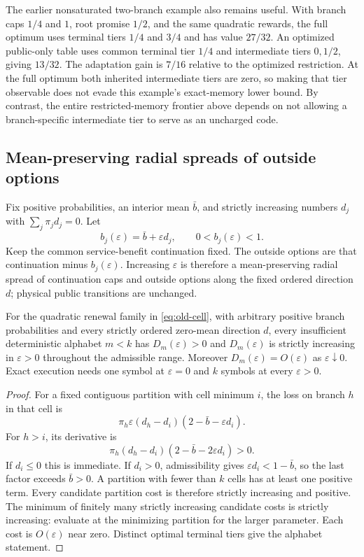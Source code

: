 The earlier nonsaturated two-branch example also remains useful. With branch caps $1/4$ and $1$, root promise $1/2$, and the same quadratic rewards, the full optimum uses terminal tiers $1/4$ and $3/4$ and has value $27/32$. An optimized public-only table uses common terminal tier $1/4$ and intermediate tiers $0,1/2$, giving $13/32$. The adaptation gain is $7/16$ relative to the optimized restriction. At the full optimum both inherited intermediate tiers are zero, so making that tier observable does not evade this example's exact-memory lower bound. By contrast, the entire restricted-memory frontier above depends on not allowing a branch-specific intermediate tier to serve as an uncharged code.

\subsection{Mean-preserving radial spreads of outside options}
Fix positive probabilities, an interior mean $\bar b$, and strictly increasing numbers $d_j$ with $\sum_j\pi_jd_j=0$. Let
\begin{equation}\label{eq:dispersion-family}
 b_j(\varepsilon)=\bar b+\varepsilon d_j,
 \qquad 0<b_j(\varepsilon)<1.
\end{equation}
Keep the common service-benefit continuation fixed. The outside options are that continuation minus $b_j(\varepsilon)$. Increasing $\varepsilon$ is therefore a mean-preserving radial spread of continuation caps and outside options along the fixed ordered direction $d$; physical public transitions are unchanged.

\begin{proposition}\label{prop:dispersion}
For the quadratic renewal family in \eqref{eq:old-cell}, with arbitrary positive branch probabilities and every strictly ordered zero-mean direction $d$, every insufficient deterministic alphabet $m<k$ has $D_m(\varepsilon)>0$ and $D_m(\varepsilon)$ is strictly increasing in $\varepsilon>0$ throughout the admissible range. Moreover $D_m(\varepsilon)=O(\varepsilon)$ as $\varepsilon\downarrow0$. Exact execution needs one symbol at $\varepsilon=0$ and $k$ symbols at every $\varepsilon>0$.
\end{proposition}
\begin{proof}
For a fixed contiguous partition with cell minimum $i$, the loss on branch $h$ in that cell is
\[
 \pi_h\varepsilon(d_h-d_i)(2-\bar b-\varepsilon d_i).
\]
For $h>i$, its derivative is
\[
 \pi_h(d_h-d_i)(2-\bar b-2\varepsilon d_i)>0.
\]
If $d_i\leq0$ this is immediate. If $d_i>0$, admissibility gives $\varepsilon d_i<1-\bar b$, so the last factor exceeds $\bar b>0$. A partition with fewer than $k$ cells has at least one positive term. Every candidate partition cost is therefore strictly increasing and positive. The minimum of finitely many strictly increasing candidate costs is strictly increasing: evaluate at the minimizing partition for the larger parameter. Each cost is $O(\varepsilon)$ near zero. Distinct optimal terminal tiers give the alphabet statement.
\end{proof}

